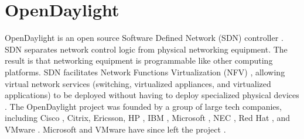 \section{OpenDaylight}

OpenDaylight is an open source Software Defined Network (SDN)
controller \cite{hid-sp18-419-www-opendaylight}. SDN
separates network control logic from physical networking
equipment. The result is that networking equipment is programmable
like other computing platforms. SDN facilitates Network Functions
Virtualization (NFV) , allowing virtual network services
(switching, virtualized appliances, and virtualized applications) to
be deployed without having to deploy specialized physical devices
\cite{hid-sp18-419-www-cio-sdn-nfv}. The OpenDaylight project was
founded by a group of large tech companies, including Cisco
, Citrix, Ericsson, HP
, IBM , Microsoft , NEC
, Red Hat , and VMware
. Microsoft and VMware have since left the project
\cite{hid-sp18-419-www-sdx-odl}.
